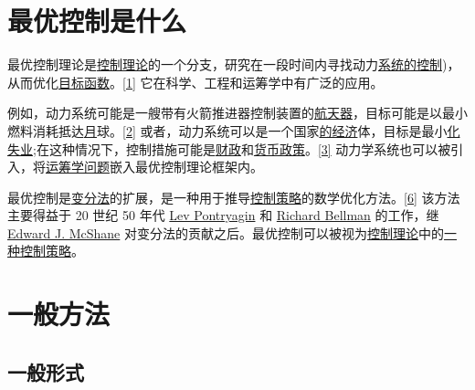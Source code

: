 \section{最优控制是什么}

最优控制理论是\href{https://en.wikipedia.org/wiki/Control_theory}{控制理论}的一个分支，研究在一段时间内寻找动力\href{https://en.wikipedia.org/wiki/Dynamical_system}{系统的}\href{https://en.wikipedia.org/wiki/Control_(optimal_control_theory}{控制})，从而优化\href{https://en.wikipedia.org/wiki/Objective_function}{目标函数}。\href{https://en.wikipedia.org/wiki/Optimal_control#cite_note-:0-1}{[1]} 它在科学、工程和运筹学中有广泛的应用。

例如，动力系统可能是一艘带有火箭推进器控制装置的\href{https://en.wikipedia.org/wiki/Spacecraft}{航天器}，目标可能是以最小燃料消耗抵达\href{https://en.wikipedia.org/wiki/Moon}{月}球。\href{https://en.wikipedia.org/wiki/Optimal_control#cite_note-2}{[2]} 或者，动力系统可以是一个国家\href{https://en.wikipedia.org/wiki/Economy}{的经济}体，目标是最小\href{https://en.wikipedia.org/wiki/Unemployment}{化失业};在这种情况下，控制措施可能是\href{https://en.wikipedia.org/wiki/Fiscal_policy}{财政}和\href{https://en.wikipedia.org/wiki/Monetary_policy}{货币政策}。\href{https://en.wikipedia.org/wiki/Optimal_control#cite_note-3}{[3]} 动力学系统也可以被引入，将\href{https://en.wikipedia.org/wiki/Operations_research}{运筹学问题}嵌入最优控制理论框架内。

最优控制是\href{https://en.wikipedia.org/wiki/Calculus_of_variations}{变分法}的扩展，是一种用于推导\href{https://en.wikipedia.org/wiki/Control_theory}{控制策略}的数学优化方法。\href{https://en.wikipedia.org/wiki/Optimal_control#cite_note-6}{[6]} 该方法主要得益于 20 世纪 50 年代 \href{https://en.wikipedia.org/wiki/Lev_Pontryagin}{Lev Pontryagin} 和 \href{https://en.wikipedia.org/wiki/Richard_Bellman}{Richard Bellman} 的工作，继 \href{https://en.wikipedia.org/wiki/Edward_J._McShane}{Edward J. McShane} 对变分法的贡献之后。最优控制可以被视为\href{https://en.wikipedia.org/wiki/Control_theory}{控制理论}中的\href{https://en.wikipedia.org/wiki/Control_strategy}{一种控制策略}。

\section{一般方法}

\subsection{一般形式}

